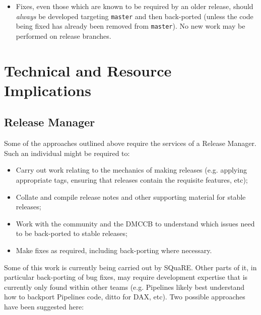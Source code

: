 \documentclass[DM,toc]{lsstdoc}
\begin{document}
\begin{itemize}
{\begin{itemize}
      \item{Fixes, even those which are known to be required by an older
      release, should \textit{always} be developed targeting \texttt{master}
      and then back-ported (unless the code being fixed has already been
      removed from \texttt{master}). No new work may be performed on release
      branches.}

    \end{itemize}

  }

\end{itemize}

\section{Technical and Resource Implications}
\label{sec:resource}

\subsection{Release Manager}
\label{sec:releasemanager}

Some of the approaches outlined above require the services of a Release
Manager. Such an individual might be required to:

\begin{itemize}

  \item{Carry out work relating to the mechanics of making releases (e.g.
  applying appropriate tags, ensuring that releases contain the requisite
  features, etc);}
  \item{Collate and compile release notes and other supporting material for
  stable releases;}
  \item{Work with the community and the DMCCB to understand which issues need
  to be back-ported to stable releases;}
  \item{Make fixes as required, including back-porting where necessary.}

\end{itemize}

Some of this work is currently being carried out by SQuaRE. Other parts of it,
in particular back-porting of bug fixes, may require development expertise
that is currently only found within other teams (e.g. Pipelines likely best
understand how to backport Pipelines code, ditto for DAX, etc). Two possible
approaches have been suggested here:
\end{document}
